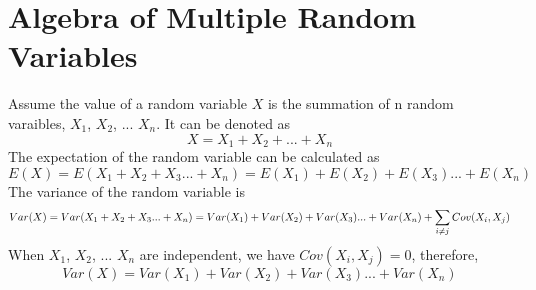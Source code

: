 \documentclass[12pt, oneside]{article}
\begin{document}
\section{Algebra of Multiple Random Variables}
Assume the value of a random variable $X$ is the summation of n random varaibles, $X_1$, $X_2$, ... $X_n$. It can be denoted as
$$X=X_1+X_2+ ... +X_n$$
The expectation of the random variable can be calculated as 
$$E(X)=E(X_1+X_2+X_3 ... +X_n)=E(X_1)+E(X_2)+E(X_3)...+E(X_n)$$
The variance of the random variable is 
$$Var(X)=Var(X_1+X_2+X_3 ... +X_n)=Var(X_1)+Var(X_2)+Var(X_3)...+Var(X_n)+\sum_{i\neq	j}\mathnormal{Cov}(X_i, X_j)$$
When $X_1$, $X_2$, ... $X_n$ are independent, we have $Cov(X_i, X_j)=0$, therefore,
$$Var(X)=Var(X_1)+Var(X_2)+Var(X_3)...+Var(X_n)$$
\end{document}
